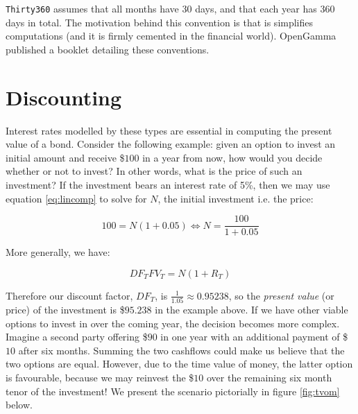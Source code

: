 \texttt{Thirty360} assumes that all months have 30 days, and that each year has
360 days in total. The motivation behind this convention is that is simplifies
computations (and it is firmly cemented in the financial world).
OpenGamma\cite{marketconvs} published a booklet detailing these conventions.

\section{Discounting}\label{sec:discounting}

Interest rates modelled by these types are essential in computing the present
value of a bond. Consider the following example: given an option to invest an
initial amount and receive \$$100$ in a year from now, how would you decide 
whether or not to invest? In other words, what is the price of such an 
investment? If the investment bears an interest rate of 5\%, then we may use
equation \ref{eq:lincomp} to solve for $N$, the initial investment i.e. the price:

\begin{equation}
100 = N (1 + 0.05) \Leftrightarrow N = \frac{100}{1+0.05}
\end{equation}

More generally, we have:

\begin{equation}
DF_T FV_T= N (1 + R_T)
\end{equation}

Therefore our discount factor, $DF_T$, is $\frac{1}{1.05} \approx 0.95238$,
so the \emph{present value} (or price) of the investment is \$$95.238$
in the example above. If we have other viable options to invest in over the coming
year, the decision becomes more complex.\\

Imagine a second party offering \$$90$ in one year with an additional payment of
\$$10$ after six months. Summing the two cashflows could make us believe that the
two options are equal. However, due to the time value of money, the latter option
is favourable, because we may reinvest the \$$10$ over the remaining six
month tenor of the investment! We present the scenario pictorially in figure
\ref{fig:tvom} below.

